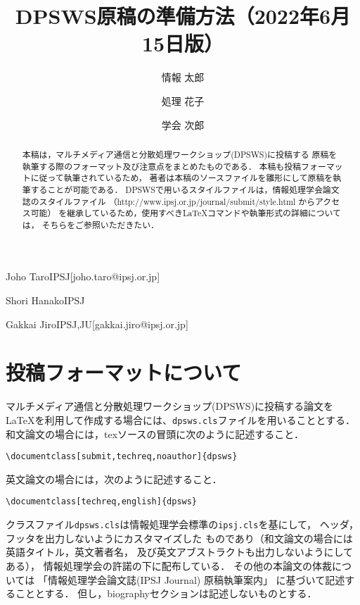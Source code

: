 \documentclass[submit,techreq,noauthor]{dpsws}
\begin{document}
\title{DPSWS原稿の準備方法（2022年6月15日版）}



\author{情報 太郎}{Joho Taro}{IPSJ}[joho.taro@ipsj.or.jp]
\author{処理 花子}{Shori Hanako}{IPSJ}
\author{学会 次郎}{Gakkai Jiro}{IPSJ,JU}[gakkai.jiro@ipsj.or.jp]

\begin{abstract}
本稿は，マルチメディア通信と分散処理ワークショップ(DPSWS)に投稿する
原稿を執筆する際のフォーマット及び注意点をまとめたものである．
本稿も投稿フォーマットに従って執筆されているため，
著者は本稿のソースファイルを雛形にして原稿を執筆することが可能である．
DPSWSで用いるスタイルファイルは，情報処理学会論文誌のスタイルファイル
（http://www.ipsj.or.jp/journal/submit/style.html からアクセス可能）
を継承しているため，使用すべき{\LaTeX}コマンドや執筆形式の詳細については，
そちらをご参照いただきたい．
\end{abstract}

\maketitle

\section{投稿フォーマットについて}

マルチメディア通信と分散処理ワークショップ(DPSWS)に投稿する論文を
{\LaTeX}を利用して作成する場合には、\texttt{dpsws.cls}ファイルを用いることとする．
和文論文の場合には，texソースの冒頭に次のように記述すること．\\

\begin{verbatim}
\documentclass[submit,techreq,noauthor]{dpsws}

\end{verbatim}

\noindent
英文論文の場合には，次のように記述すること．\\

\begin{verbatim}
\documentclass[techreq,english]{dpsws}

\end{verbatim}

クラスファイル\texttt{dpsws.cls}は情報処理学会標準の\texttt{ipsj.cls}を基にして，
ヘッダ，フッタを出力しないようにカスタマイズした
ものであり（和文論文の場合には英語タイトル，英文著者名，
及び英文アブストラクトも出力しないようにしてある），
情報処理学会の許諾の下に配布している．
その他の本論文の体裁については
「情報処理学会論文誌(IPSJ Journal) 原稿執筆案内」
\cite{ipsjFormat}に基づいて記述することとする．
但し，biographyセクションは記述しないものとする．
\end{document}
